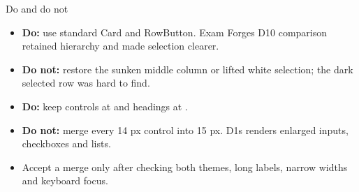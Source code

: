 \begin{standardframe}{Do and do not}
\begin{itemize}
\item \textbf{Do:} use standard Card and RowButton. Exam Forge\textquotesingle s D10 comparison retained hierarchy and made selection clearer.
\item \textbf{Do not:} restore the sunken middle column or lifted white selection; the dark selected row was hard to find.
\item \textbf{Do:} keep controls at  and headings at .
\item \textbf{Do not:} merge every 14 px control into 15 px. D1\textquotesingle s renders enlarged inputs, checkboxes and lists.
\item Accept a merge only after checking both themes, long labels, narrow widths and keyboard focus.
\end{itemize}
\end{standardframe}
